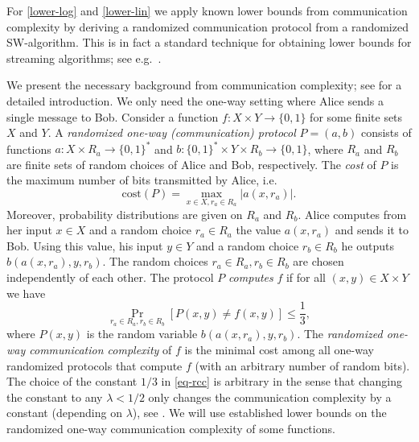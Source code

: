 \documentclass{theoretics}
\renewcommand{\leq}{\leqslant}
\renewcommand{\le}{\leq}
\begin{document}
For \ref{lower-log} and \ref{lower-lin}
we apply known lower bounds from communication complexity
by deriving a randomized communication protocol from 
a randomized SW-algorithm.
This is in fact a standard technique for obtaining lower bounds for streaming algorithms; see e.g.~\cite{Roughgarden16}.

We present the necessary background from communication complexity; see \cite{KushilevitzN97}
for a detailed introduction.  
We only need the one-way setting where Alice sends a single message to Bob.
Consider a function $f \colon X \times Y \to \{0,1\}$ for some finite sets $X$ and $Y$.
A {\em randomized one-way (communication) protocol} $P=(a,b)$ consists of functions
$a \colon X\times R_a \to \{0,1\}^*$ and $b \colon \{0,1\}^* \times Y \times R_b \to\{0,1\}$, where
$R_a$ and $R_b$ are finite sets of random choices of Alice and Bob, respectively.
The {\em cost} of $P$ is the maximum number of bits transmitted by Alice, i.e.
\[
	\mathrm{cost}(P) = \max_{x \in X, r_a \in R_a} |a(x,r_a)|. 
\]
Moreover, probability distributions are given on $R_a$ and $R_b$.
Alice computes from her input $x \in X$ and a random choice $r_a \in R_a$
the value $a(x,r_a)$ and sends it to Bob.
Using this value, his input $y \in Y$ and a random choice $r_b \in R_b$
he outputs $b(a(x,r_a),y,r_b)$. 
The random choices $r_a \in R_a, r_b \in R_b$ are chosen independently of each other.
The protocol $P$ {\em computes} $f$ if 
for all $(x,y) \in X \times Y$ we have
\begin{equation} \label{eq-rcc}
\Pr_{r_a \in R_a, r_b \in R_b}[P(x,y) \neq f(x,y)] \le \frac{1}{3},
\end{equation}
where $P(x,y)$ is the random variable $b(a(x,r_a),y,r_b)$.
The {\em randomized one-way communication complexity} of $f$ is the minimal cost
among all one-way randomized protocols that compute $f$ (with an arbitrary number of random bits).
The choice of the constant $1/3$ in \eqref{eq-rcc} is arbitrary in the sense that changing the constant
to any $\lambda < 1/2$ only changes the communication complexity
by a constant (depending on $\lambda$),
see \cite[p.~30]{KushilevitzN97}.
We will use established lower bounds on the randomized one-way communication complexity of some functions.
\end{document}

